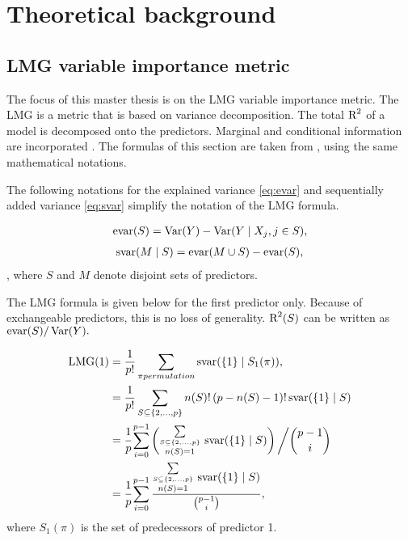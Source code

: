 \documentclass[11pt,a4paper,twoside]{book}
\begin{document}








\chapter{Theoretical background} 

\section{LMG variable importance metric}

The focus of this master thesis is on the LMG variable importance metric. The LMG is a metric that is based on variance decomposition. The total $\text{R}^2$ of a model is decomposed onto the predictors. Marginal and conditional information are incorporated \citep{Gromping2015} .  The  formulas of this section are taken from \cite{Gromping2015}, using the same mathematical notations. 

The following notations for the explained variance \eqref{eq:evar} and sequentially added variance \eqref{eq:svar} simplify the notation of the LMG formula. 

   \begin{align} 
     \text{evar}(S) = \operatorname{Var}(Y) - \operatorname{Var}( Y \mid X_{j}, j \in S),   \label{eq:evar} 
   \end{align} 
   \begin{align} 
     \text{svar}(M \mid S) = \text{evar}(M \cup S) - \text{evar}(S), \label{eq:svar} 
    \end{align} , where $S$ and $M$ denote disjoint sets of predictors.
    
   The LMG formula is given below for the first predictor only. Because of exchangeable predictors, this is no loss of generality.  $\text{R}^2(S)$ can be written as $\text{evar}(S)/\operatorname{Var}(Y).$ 

   \begin{align} 
     \LMG(1) &= \frac{1}{p!} \sum_{\pi permutation}^{} \SVAR(\{1\} \mid S_{1}(\pi)),   \label{eq:lmgw1}  \\
     &= \frac{1}{p!} \sum_{S \subseteq \{ 2, \dots, p \} }^{} n(S)! \, (p-n(S)-1)! \, \SVAR(\{1\} \mid S) \label{eq:lmgw2}  \\
     &=  \cfrac{1}{p} \sum_{i=0}^{p-1} \left( \substack {\sum\limits_{ S \subseteq \{ 2, \dots, p \}}\\n(S)=1}^{} \ \SVAR(\{1\} \mid S)\right)\bigg/ \binom{p-1}{i}  \label{eq:lmgw3}  \\   
         &=  \cfrac{1}{p} \sum_{i=0}^{p-1} \frac{ \substack{\sum\limits_{ S \subseteq \{ 2, \dots, p \}}\\n(S)=1}^{} \ \SVAR(\{1\} \mid S)}{\binom{p-1}{i}}, \nonumber \\      
   \end{align}
   where $S_{1}(\pi)$ is the set of predecessors of predictor 1.
   
\end{document}
